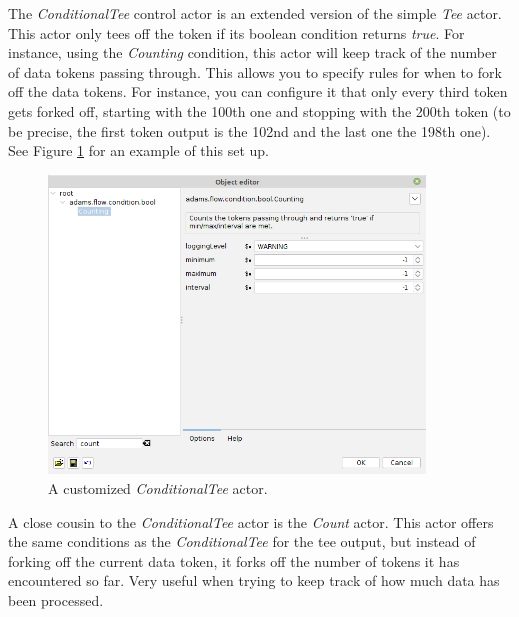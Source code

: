 The \textit{ConditionalTee} control actor is an extended version of the simple
\textit{Tee} actor. This actor only tees off the token if its boolean condition
returns \textit{true}. For instance, using the \textit{Counting} condition, this
actor will keep track of the number of data tokens passing through. This allows
you to specify rules for when to fork off the data tokens.
For instance, you can configure it that only every third token gets forked off,
starting with the 100th one and stopping with the 200th token (to be precise,
the first token output is the 102nd and the last one the 198th one). See Figure
\ref{floweditor-conditionaltee} for an example of this set up.
\begin{figure}[htb]
  \centering
  \includegraphics[width=10.0cm]{images/floweditor-conditionaltee.png}
  \caption{A customized \textit{ConditionalTee} actor.}
  \label{floweditor-conditionaltee}
\end{figure}

A close cousin to the \textit{ConditionalTee} actor is the \textit{Count} actor.
This actor offers the same conditions as the \textit{ConditionalTee} for the
tee output, but instead of forking off the current data token, it forks off the
number of tokens it has encountered so far. Very useful when trying to keep
track of how much data has been processed.

